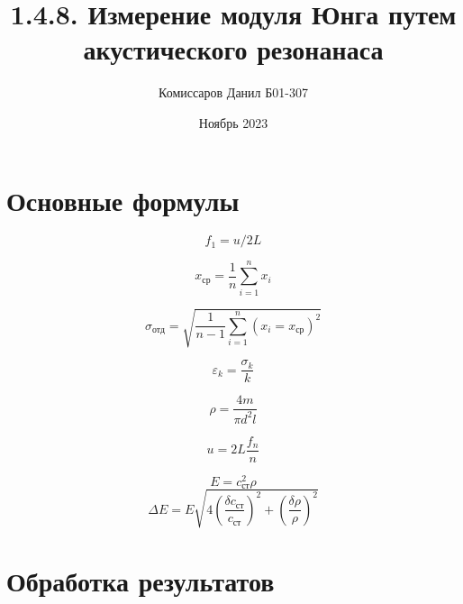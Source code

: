 \documentclass[a4paper,10pt]{article}
\title{1.4.8. Измерение модуля Юнга путем акустического резонанаса}
\author{Комиссаров Данил Б01-307}
\date{Ноябрь 2023}
\begin{document}
	
	\maketitle
	
	\section{Основные формулы}
	\begin{equation}
		f_1 = u / 2L
		\label{estimated f1}
	\end{equation}
	
	\begin{equation}
		x_\text{ср} = \frac{1}{n}\sum^n_{i=1}{x_i}
		\label{x mid}
	\end{equation}
	
	\begin{equation}
		\sigma_\text{отд} = \sqrt{\frac{1}{n - 1}\sum^n_{i=1}{(x_i = x_\text{ср})^2}}
		\label{exp fault}
	\end{equation}
	
	\begin{equation}
		\varepsilon_k = \frac{\sigma_k}{k}
		\label{rel fault}
	\end{equation}
	
	\begin{equation}
		\rho = \frac{4m}{\pi d^2 l}
		\label{density}
	\end{equation}
	
	\begin{equation}
		u = 2L\frac{f_n}{n}
		\label{sound spped}
	\end{equation}
	
	\begin{equation}
		E = c_\text{ст}^2 \rho
		\label{Ung}
	\end{equation}
	\begin{equation}
		\Delta E = E \sqrt{4(\frac{\delta c_\text{ст}}{c_\text{ст}})^2 + (\frac{\delta\rho}{\rho})^2}
		\label{Ung acc}
	\end{equation}
	
	\section{Обработка результатов}
\end{document}
